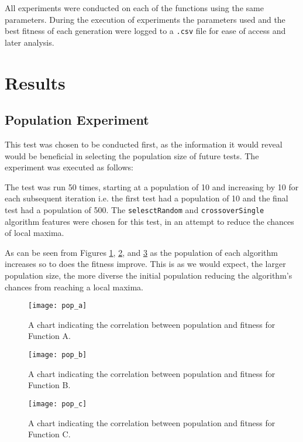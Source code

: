 		All experiments were conducted on each of the functions using the same parameters. During the execution of experiments the parameters used and the best fitness of each generation were logged to a \texttt{.csv} file for ease of access and later analysis.

\section{Results}
	\subsection{Population Experiment}
		This test was chosen to be conducted first, as the information it  would reveal would be beneficial in selecting the population size of future tests. The experiment was executed as follows:
		
		The test was run 50 times, starting at a population of 10 and increasing by 10 for each subsequent iteration i.e. the first test had a population of 10 and the final test had a population of 500. The \texttt{selesctRandom} and \texttt{crossoverSingle} algorithm features were chosen for this test, in an attempt to reduce the chances of local maxima.
		
		As can be seen from Figures \ref{chart_pop_a}, \ref{chart_pop_b},  and \ref{chart_pop_c} as the population of each algorithm increases so to does the fitness improve. This is as we would expect, the larger population size, the more diverse the initial population reducing the algorithm's chances from reaching a local maxima. 
		
		\begin{figure}[h]
			\centering
			\texttt{[image: pop\_a]}
			\caption{A chart indicating the correlation between population and fitness for Function A.}
			\label{chart_pop_a}
		\end{figure} 

		\begin{figure}[h]
			\centering
			\texttt{[image: pop\_b]}
			\caption{A chart indicating the correlation between population and fitness for Function B.}
			\label{chart_pop_b}
		\end{figure}

		\begin{figure}[h]
			\centering
			\texttt{[image: pop\_c]}
			\caption{A chart indicating the correlation between population and fitness for Function C.}
			\label{chart_pop_c}
		\end{figure}
	
